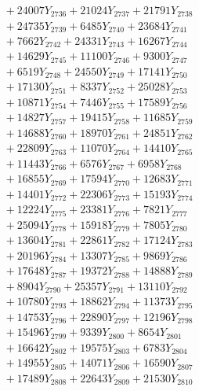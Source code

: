 \documentclass[a4paper,10pt]{article}
\begin{document}
{\begin{align}
&\;  + 24007 Y_{2736} + 21024 Y_{2737} + 21791 Y_{2738} \\[0.3ex]
&\;  + 24735 Y_{2739} + 6485 Y_{2740} + 23684 Y_{2741} \\[0.3ex]
&\;  + 7662 Y_{2742} + 24331 Y_{2743} + 16267 Y_{2744} \\[0.3ex]
&\;  + 14629 Y_{2745} + 11100 Y_{2746} + 9300 Y_{2747} \\[0.3ex]
&\;  + 6519 Y_{2748} + 24550 Y_{2749} + 17141 Y_{2750} \\[0.3ex]
&\;  + 17130 Y_{2751} + 8337 Y_{2752} + 25028 Y_{2753} \\[0.3ex]
&\;  + 10871 Y_{2754} + 7446 Y_{2755} + 17589 Y_{2756} \\[0.3ex]
&\;  + 14827 Y_{2757} + 19415 Y_{2758} + 11685 Y_{2759} \\[0.5ex]\allowbreak
&\;  + 14688 Y_{2760} + 18970 Y_{2761} + 24851 Y_{2762} \\[0.3ex]
&\;  + 22809 Y_{2763} + 11070 Y_{2764} + 14410 Y_{2765} \\[0.3ex]
&\;  + 11443 Y_{2766} + 6576 Y_{2767} + 6958 Y_{2768} \\[0.3ex]
&\;  + 16855 Y_{2769} + 17594 Y_{2770} + 12683 Y_{2771} \\[0.3ex]
&\;  + 14401 Y_{2772} + 22306 Y_{2773} + 15193 Y_{2774} \\[0.3ex]
&\;  + 12224 Y_{2775} + 23381 Y_{2776} + 7821 Y_{2777} \\[0.3ex]
&\;  + 25094 Y_{2778} + 15918 Y_{2779} + 7805 Y_{2780} \\[0.3ex]
&\;  + 13604 Y_{2781} + 22861 Y_{2782} + 17124 Y_{2783} \\[0.3ex]
&\;  + 20196 Y_{2784} + 13307 Y_{2785} + 9869 Y_{2786} \\[0.3ex]
&\;  + 17648 Y_{2787} + 19372 Y_{2788} + 14888 Y_{2789} \\[0.5ex]\allowbreak
&\;  + 8904 Y_{2790} + 25357 Y_{2791} + 13110 Y_{2792} \\[0.3ex]
&\;  + 10780 Y_{2793} + 18862 Y_{2794} + 11373 Y_{2795} \\[0.3ex]
&\;  + 14753 Y_{2796} + 22890 Y_{2797} + 12196 Y_{2798} \\[0.3ex]
&\;  + 15496 Y_{2799} + 9339 Y_{2800} + 8654 Y_{2801} \\[0.3ex]
&\;  + 16642 Y_{2802} + 19575 Y_{2803} + 6783 Y_{2804} \\[0.3ex]
&\;  + 14955 Y_{2805} + 14071 Y_{2806} + 16590 Y_{2807} \\[0.3ex]
&\;  + 17489 Y_{2808} + 22643 Y_{2809} + 21530 Y_{2810} \\[0.3ex]

\end{align}}
\end{document}
